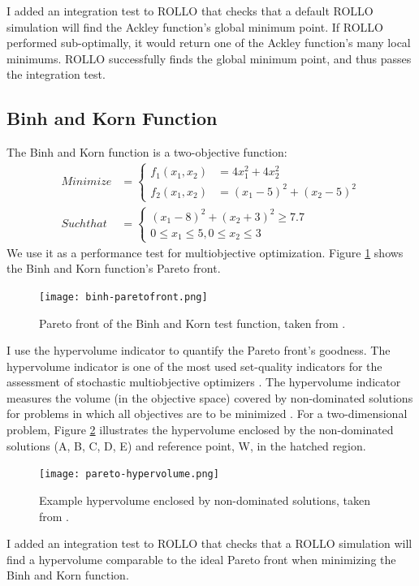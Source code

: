 I added an integration test to \gls{ROLLO} that checks that a default \gls{ROLLO} 
simulation will find the Ackley function's global minimum point. 
If \gls{ROLLO} performed sub-optimally, it would return one of the Ackley 
function's many local minimums. 
\gls{ROLLO} successfully finds the global minimum point, and thus passes the 
integration test. 

\subsection{Binh and Korn Function}
The Binh and Korn function \cite{binh_mobes_1997} is a two-objective function:
\begin{align}
    Minimize &= \begin{cases}
        f_1 (x_1,x_2) &= 4x_1^2+4x_2^2 \\
        f_2 (x_1,x_2) &= (x_1-5)^2 + (x_2-5)^2 
    \end{cases} \\
    Such that &= \begin{cases}
        (x_1-8)^2 + (x_2+3)^2 \geq 7.7 \nonumber \\
        0 \leq x_1 \leq 5, 0 \leq x_2 \leq 3 \nonumber
    \end{cases}
\end{align}
We use it as a performance test for multiobjective optimization.
Figure \ref{fig:binh_paretofront} shows the Binh and Korn function's Pareto front.
\begin{figure}[]
    \centering
    \texttt{[image: binh-paretofront.png]} 
    \caption{Pareto front of the Binh and Korn test function, taken from 
    \cite{bassi_statistics_2018}. }
    \label{fig:binh_paretofront}
\end{figure}
I use the hypervolume indicator to quantify the Pareto front's goodness. 
The hypervolume indicator is one of the most used set-quality indicators for the 
assessment of stochastic multiobjective optimizers \cite{guerreiro_hypervolume_2020}.
The hypervolume indicator measures the volume (in the objective space) covered by 
non-dominated solutions for problems in which all objectives are to be 
minimized \cite{deb_multi-objective_2001}. 
For a two-dimensional problem, Figure \ref{fig:pareto_hypervolume} illustrates the 
hypervolume enclosed by the non-dominated solutions (A, B, C, D, E) and reference 
point, W, in the hatched region. 
\begin{figure}[]
    \centering
    \texttt{[image: pareto-hypervolume.png]} 
    \caption{Example hypervolume enclosed by non-dominated solutions, taken from 
    \cite{deb_multi-objective_2001}.}
    \label{fig:pareto_hypervolume}
\end{figure}
I added an integration test to ROLLO that checks that a ROLLO simulation will 
find a hypervolume comparable to the ideal Pareto front when minimizing the
Binh and Korn function. 

